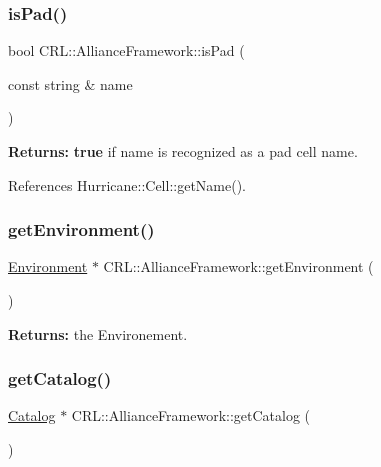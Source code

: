 \subsubsection{\texorpdfstring{is\+Pad()}{isPad()}}
{\footnotesize\ttfamily bool C\+R\+L\+::\+Alliance\+Framework\+::is\+Pad (\begin{DoxyParamCaption}\item[{const string \&}]{name }\end{DoxyParamCaption})\hspace{0.3cm}{\ttfamily [inline]}}

{\bfseries Returns\+:} {\bfseries true} if {\ttfamily name} is recognized as a pad cell name. 

References Hurricane\+::\+Cell\+::get\+Name().

\mbox{\label{classCRL_1_1AllianceFramework_a8e044592d2ceaea0060aec5dc5cc6900}} 
\subsubsection{\texorpdfstring{get\+Environment()}{getEnvironment()}}
{\footnotesize\ttfamily \hyperlink{classCRL_1_1Environment}{Environment} $\ast$ C\+R\+L\+::\+Alliance\+Framework\+::get\+Environment (\begin{DoxyParamCaption}{ }\end{DoxyParamCaption})\hspace{0.3cm}{\ttfamily [inline]}}

{\bfseries Returns\+:} the Environement. \mbox{\label{classCRL_1_1AllianceFramework_a036bd6fa8f837c81f60b9d424f817add}} 
\subsubsection{\texorpdfstring{get\+Catalog()}{getCatalog()}}
{\footnotesize\ttfamily \hyperlink{classCRL_1_1Catalog}{Catalog} $\ast$ C\+R\+L\+::\+Alliance\+Framework\+::get\+Catalog (\begin{DoxyParamCaption}{ }\end{DoxyParamCaption})\hspace{0.3cm}{\ttfamily [inline]}}


